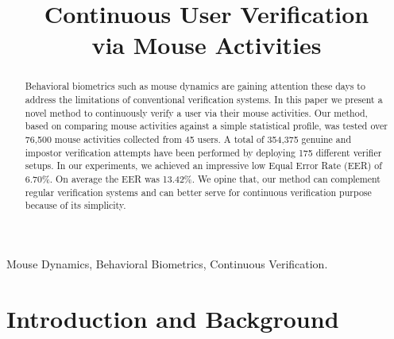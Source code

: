 \documentclass[conference]{IEEEtran}
\begin{document}
\title{Continuous User Verification\\via Mouse Activities}


\author{
}


\maketitle


\begin{abstract}
Behavioral biometrics such as mouse dynamics are gaining attention these days to address the limitations of
conventional verification systems. In this paper we present a novel method to continuously verify a user via
their mouse activities. Our method, based on comparing mouse activities against a simple statistical profile, was tested over 76,500 mouse activities collected from 45 users.
A total of 354,375 genuine and impostor verification attempts have been performed by deploying 175 different verifier
setups. In our experiments, we achieved an impressive low Equal Error Rate (EER) of 6.70\%. On average the EER
was 13.42\%. We opine that, our method can complement regular verification systems and can better serve for
continuous verification purpose because of its simplicity.
\end{abstract}
\begin{IEEEkeywords} 
Mouse Dynamics,
Behavioral Biometrics,
Continuous Verification.
 \end{IEEEkeywords}
\IEEEpeerreviewmaketitle

\section{Introduction and Background}
\end{document}
